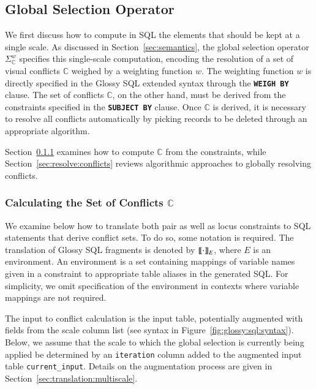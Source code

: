 \documentclass[11pt, oneside]{report}
\newcommand{\denote}[1]{\text{$[\![ $#1$ ]\!]$}}
\begin{document}
\subsection{Global Selection Operator}
\label{sec:translation:global:selection}

We first discuss how to compute in SQL the elements that should be kept at a single scale. As discussed in Section~\ref{sec:semantics}, the global selection operator $\Sigma_{\mathbb{C}}^{w}$ specifies this single-scale computation, encoding the resolution of a set of visual conflicts $\mathbb{C}$ weighed by a weighting function $w$. The weighting function $w$ is directly specified in the Glossy SQL extended syntax through the \textbf{\texttt{WEIGH BY}} clause. The set of conflicts $\mathbb{C}$, on the other hand, must be derived from the constraints specified in the \textbf{\texttt{SUBJECT BY}} clause. Once $\mathbb{C}$ is derived, it is necessary to resolve all conflicts automatically by picking records to be deleted through an appropriate algorithm.  

Section~\ref{sec:calc:conflicts} examines how to compute $\mathbb{C}$ from the constraints, while Section~\ref{sec:resolve:conflicts} reviews algorithmic approaches to globally resolving conflicts. 

\subsubsection{Calculating the Set of Conflicts $\mathbb{C}$}
\label{sec:calc:conflicts}

We examine below how to translate both pair as well as locus constraints to SQL statements that derive conflict sets. To do so, some notation is required. The translation of Glossy SQL fragments is denoted by $\denote{$\cdot$}_E$, where $E$ is an environment. An environment is a set containing mappings of variable names given in a constraint to appropriate table aliases in the generated SQL. For simplicity, we omit specification of the environment in contexts where variable mappings are not required.  

The input to conflict calculation is the input table, potentially augmented with fields from the scale column list (see syntax in Figure~\ref{fig:glossy:sql:syntax}). Below, we assume that the scale to which the global selection is currently being applied be determined by an \texttt{iteration} column added to the augmented input table \texttt{current\_input}. Details on the augmentation process are given in Section~\ref{sec:translation:multiscale}. 
\end{document}
